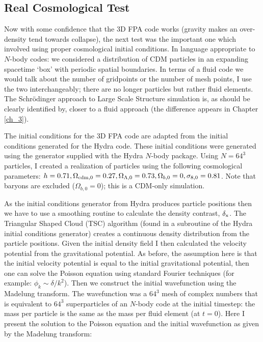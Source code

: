\subsection{Real Cosmological Test}
\label{rct}
Now with some confidence that the 3D FPA code works (gravity makes an over-density tend towards collapse), the next test was the important one which involved using proper cosmological initial conditions. In language appropriate to $N$-body codes: we considered a distribution of CDM particles in an expanding spacetime `box' with periodic spatial boundaries. In terms of a fluid code we would talk about the number of gridpoints or the number of mesh points, I use the two interchangeably; there are no longer particles but rather fluid elements. The Schr\"odinger approach to Large Scale Structure simulation is, as should be clearly identified by, closer to a fluid approach (the difference appears in Chapter \ref{ch_3}).

The initial conditions for the 3D FPA code are adapted from the initial conditions generated for the Hydra code. These initial conditions were generated using the generator supplied with the Hydra $N$-body package. Using $N = 64^3$ particles, I created a realization of particles using the following cosmological parameters: $h= 0.71, \Omega_{\rm cdm,0}=0.27, \Omega_{\Lambda,0}=0.73,\Omega_{b,0} =0, \sigma_{8,0}=0.81$. Note that baryons are excluded ($\Omega_{b,0} = 0$); this is a CDM-only simulation.

As the initial conditions generator from Hydra produces particle positions then we have to use a smoothing routine to calculate the density contrast, $\delta_{\rm x}$. The Triangular Shaped Cloud (TSC) algorithm (found in a subroutine of the Hydra initial conditions generator) creates a continuous density distribution from the particle positions. Given the initial density field I then calculated the velocity potential from the gravitational potential. As before, the assumption here is that the initial velocity potential is equal to the initial gravitational potential, then one can solve the Poisson equation using standard Fourier techniques (for example: $\phi_k \sim \delta / k^2$). Then we construct the initial wavefunction using the Madelung transform. The wavefunction was a $64^3$ mesh of complex numbers that is equivalent to $64^3$ superparticles of an $N$-body code at the initial timestep: the mass per particle is the same as the mass per fluid element (at $t=0$). Here I present the solution to the Poisson equation and the initial wavefunction as given by the Madelung transform:

